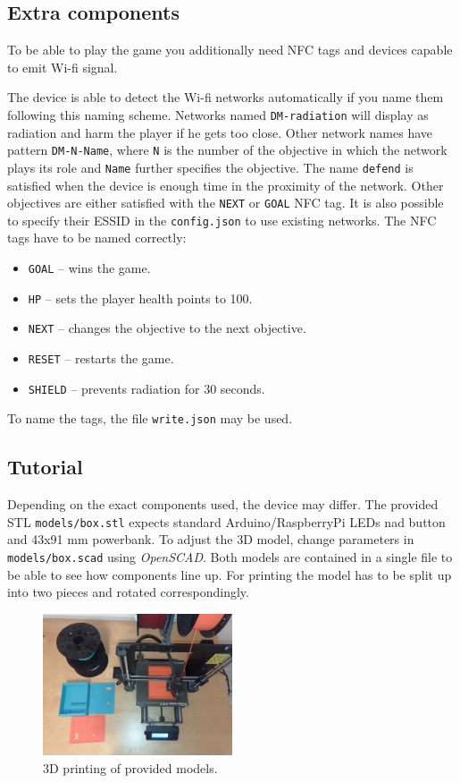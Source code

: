 \documentclass{article}
\begin{document}
\subsection{Extra components}
To be able to play the game you additionally need NFC tags and devices capable to emit Wi-fi signal.

The device is able to detect the Wi-fi networks automatically if you name them following this naming scheme.
Networks named \texttt{DM-radiation} will display as radiation and harm the player if he gets too close.
Other network names have pattern \texttt{DM-N-Name}, where \texttt{N} is the number of the objective in which the network plays its role and \texttt{Name} further specifies the objective.
The name \texttt{defend} is satisfied when the device is enough time in the proximity of the network. 
Other objectives are either satisfied with the \texttt{NEXT} or \texttt{GOAL} NFC tag.
It is also possible to specify their ESSID in the \texttt{config.json} to use existing networks.
The NFC tags have to be named correctly:
\begin{itemize}
    \item \texttt{GOAL} -- wins the game.
    \item \texttt{HP} -- sets the player health points to 100.
    \item \texttt{NEXT} -- changes the objective to the next objective.
    \item \texttt{RESET} -- restarts the game.
    \item \texttt{SHIELD} --  prevents radiation for 30 seconds.
\end{itemize}
To name the tags, the file \texttt{write.json} may be used.

\subsection{Tutorial}
    Depending on the exact components used, the device may differ.
    The provided STL \texttt{models/box.stl} expects standard Arduino/RaspberryPi LEDs nad button and 43x91 mm powerbank.
    To adjust the 3D model, change parameters in \texttt{models/box.scad} using \emph{OpenSCAD}.
    Both models are contained in a single file to be able to see how components line up.
    For printing the model has to be split up into two pieces and rotated correspondingly. 

\begin{figure}[ht]
    \centering
    \includegraphics[width=0.5\textwidth]{imgs/Printing.jpg}
    \caption{3D printing of provided models.}
\end{figure}
\end{document}
